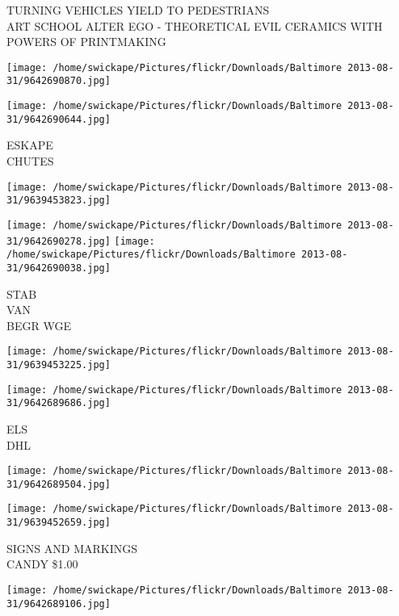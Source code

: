 \documentclass[10pt,letterpaper]{article}
\begin{document}
TURNING VEHICLES YIELD TO PEDESTRIANS\\
ART SCHOOL ALTER EGO {-} THEORETICAL EVIL CERAMICS WITH POWERS OF PRINTMAKING\\
\pagebreak

\texttt{[image: /home/swickape/Pictures/flickr/Downloads/Baltimore 2013-08-31/9642690870.jpg]}

\vspace{0.25in}
\texttt{[image: /home/swickape/Pictures/flickr/Downloads/Baltimore 2013-08-31/9642690644.jpg]}

ESKAPE\\
CHUTES\\
\pagebreak

\texttt{[image: /home/swickape/Pictures/flickr/Downloads/Baltimore 2013-08-31/9639453823.jpg]}

\vspace{0.25in}
\texttt{[image: /home/swickape/Pictures/flickr/Downloads/Baltimore 2013-08-31/9642690278.jpg]}
\texttt{[image: /home/swickape/Pictures/flickr/Downloads/Baltimore 2013-08-31/9642690038.jpg]}

STAB\\
VAN\\
BEGR WGE\\
\pagebreak

\texttt{[image: /home/swickape/Pictures/flickr/Downloads/Baltimore 2013-08-31/9639453225.jpg]}

\vspace{0.25in}
\texttt{[image: /home/swickape/Pictures/flickr/Downloads/Baltimore 2013-08-31/9642689686.jpg]}

ELS\\
DHL\\
\pagebreak

\texttt{[image: /home/swickape/Pictures/flickr/Downloads/Baltimore 2013-08-31/9642689504.jpg]}

\vspace{0.25in}
\texttt{[image: /home/swickape/Pictures/flickr/Downloads/Baltimore 2013-08-31/9639452659.jpg]}

SIGNS AND MARKINGS\\
CANDY \$1.00\\
\pagebreak

\texttt{[image: /home/swickape/Pictures/flickr/Downloads/Baltimore 2013-08-31/9642689106.jpg]}
\end{document}
